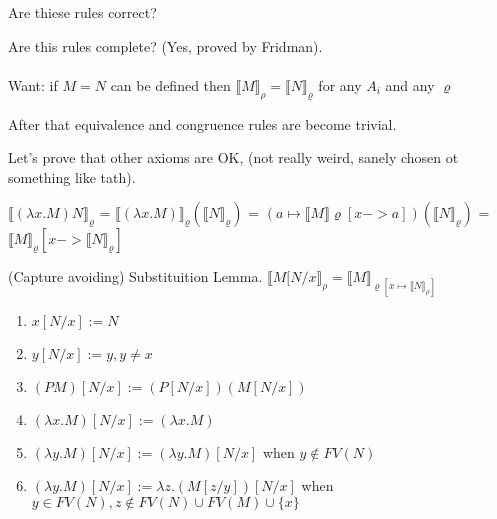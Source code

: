 \documentclass[a4paper,10pt]{book}
\newcommand{\sem}[2]{ \llbracket#1\rrbracket_{#2} }
\begin{document}
Are thiese rules correct?

Are this rules complete? (Yes, proved by Fridman).

\paragraph{}
Want: if $M=N$ can be defined then $\sem{M}{\rho} = \llbracket N \rrbracket_\varrho$ for any $A_i$  and any $\varrho$

After that equivalence and congruence rules are become trivial.

Let's prove that other axioms are OK, (not really weird, sanely chosen ot something like tath).



$\llbracket (\lambda x .M)N\rrbracket _\varrho$ =
$\llbracket (\lambda x .M)\rrbracket_\varrho (\llbracket N\rrbracket_\varrho)$ =
$(a \mapsto \llbracket M\rrbracket\varrho[x->a]) (\llbracket N\rrbracket_\varrho)$ =
$\llbracket M \rrbracket _\varrho [x -> \llbracket N\rrbracket_\varrho]$ 


(Capture avoiding) Substituition Lemma.
$\llbracket M[N/x\rrbracket_\rho = \llbracket M\rrbracket_{\varrho
[x \mapsto \llbracket N\rrbracket_\rho]}$


\begin{enumerate}
\item $x[N/x] := N$
\item $y[N/x] := y, y \neq x$
\item $(PM)[N/x] := (P[N/x]) (M[N/x])$
\item $(\lambda x . M)[N/x] := (\lambda x . M)$
\item $(\lambda y . M)[N/x] := (\lambda y . M)[N/x]$ when $y \not\in FV(N)$
\item $(\lambda y . M)[N/x] := \lambda z . (M[z/y])[N/x]$ when $y \in FV(N), z \not\in FV(N) \cup FV(M) \cup \{x\}$
\end{enumerate}
\end{document}
